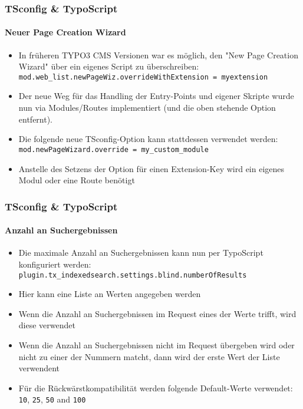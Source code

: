 \begin{frame}[fragile]
	\frametitle{TSconfig \& TypoScript}
	\framesubtitle{Neuer Page Creation Wizard}

	\begin{itemize}
		\item In früheren TYPO3 CMS Versionen war es möglich, den "New Page Creation Wizard" über ein eigenes Script zu überschreiben:\newline
			\small
				\texttt{mod.web\_list.newPageWiz.overrideWithExtension = myextension}
			\normalsize
		\item Der neue Weg für das Handling der Entry-Points und eigener Skripte wurde nun via Modules/Routes implementiert (und die oben stehende Option entfernt).
		\item Die folgende neue TSconfig-Option kann stattdessen verwendet werden:
			\small
				\texttt{mod.newPageWizard.override = my\_custom\_module}
			\normalsize

		\item Anstelle des Setzens der Option für einen Extension-Key wird ein eigenes Modul oder eine Route benötigt

	\end{itemize}

\end{frame}
\begin{frame}[fragile]
	\frametitle{TSconfig \& TypoScript}
	\framesubtitle{Anzahl an Suchergebnissen}

	\begin{itemize}
		\item Die maximale Anzahl an Suchergebnissen kann nun per  TypoScript konfiguriert werden:\newline
			\texttt{plugin.tx\_indexedsearch.settings.blind.numberOfResults}
		\item Hier kann eine Liste an Werten angegeben werden
		\item Wenn die Anzahl an Suchergebnissen im Request eines der Werte trifft, wird diese verwendet
		\item Wenn die Anzahl an Suchergebnissen nicht im Request übergeben wird oder nicht zu einer der Nummern matcht, dann wird der erste Wert der Liste verwendent
		\item Für die Rückwärstkompatibilität werden folgende Default-Werte verwendet:\newline
			\texttt{10}, \texttt{25}, \texttt{50} and \texttt{100}
	\end{itemize}

\end{frame}
